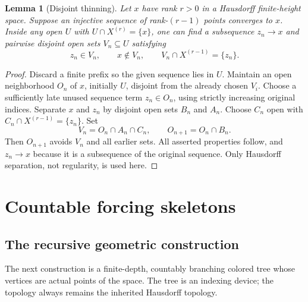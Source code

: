 \documentclass[11pt,letterpaper]{article}
\numberwithin{equation}{section}
\newtheorem{lemma}[lemma]{Lemma}
\theoremstyle{definition}
\theoremstyle{remark}
\theoremstyle{definition}
\begin{document}
\begin{lemma}[Disjoint thinning]\label{uw:lem:thinning}
Let $x$ have rank $r>0$ in a Hausdorff finite-height space. Suppose an injective
sequence of rank-$(r-1)$ points converges to $x$. Inside any open $U$ with
$U\cap X^{(r)}=\{x\}$, one can find a subsequence $z_n\to x$ and pairwise
disjoint open sets $V_n\subseteq U$ satisfying
\begin{equation}\label{uw:eq:thinning}
 z_n\in V_n,\qquad x\notin V_n,\qquad
 V_n\cap X^{(r-1)}=\{z_n\}.
\end{equation}
\end{lemma}
\begin{proof}
Discard a finite prefix so the given sequence lies in $U$. Maintain an open
neighborhood $O_n$ of $x$, initially $U$, disjoint from the already chosen
$V_i$. Choose a sufficiently late unused sequence term $z_n\in O_n$, using
strictly increasing original indices. Separate $x$ and $z_n$ by disjoint open
sets $B_n$ and $A_n$. Choose $C_n$ open with
$C_n\cap X^{(r-1)}=\{z_n\}$. Set
\[
 V_n=O_n\cap A_n\cap C_n,
 \qquad O_{n+1}=O_n\cap B_n.
\]
Then $O_{n+1}$ avoids $V_n$ and all earlier sets. All asserted properties
follow, and $z_n\to x$ because it is a subsequence of the original sequence.
Only Hausdorff separation, not regularity, is used here.
\end{proof}

\section{Countable forcing skeletons}\label{uw:sec:skeletons}

\subsection{The recursive geometric construction}
The next construction is a finite-depth, countably branching colored tree
whose vertices are actual points of the space. The tree is an indexing device;
the topology always remains the inherited Hausdorff topology.
\end{document}
